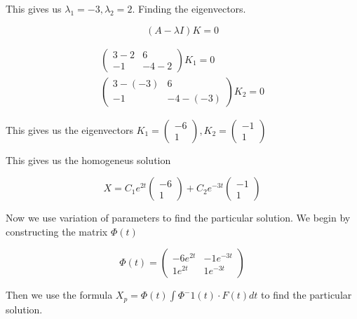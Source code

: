 \documentclass[a4paper]{article}
\begin{document}
This gives us $\lambda_1 = -3, \lambda_2 = 2$. Finding the eigenvectors.

\begin{equation}
    (A-\lambda I)K = 0
\end{equation}

\begin{align}
    \begin{pmatrix}
        3-2 & 6 \\
        -1 & -4 - 2
    \end{pmatrix}
    K_1
    = 0 \\
    \begin{pmatrix}
        3-(-3) & 6 \\
        -1 & -4 - (-3)
    \end{pmatrix}
    K_2
    = 0
\end{align}

This gives us the eigenvectors $K_1 = \begin{pmatrix}
    -6 \\
    1
\end{pmatrix}, K_2 = \begin{pmatrix}
    -1 \\
    1
\end{pmatrix}$

This gives us the homogeneus solution

\begin{equation}
    X = C_1 e^{2t} \begin{pmatrix}
        -6 \\
        1
    \end{pmatrix} + C_2 e^{-3t} \begin{pmatrix}
        -1 \\
        1
    \end{pmatrix}
\end{equation}

Now we use variation of parameters to find the particular solution. We begin by constructing the matrix $\Phi(t)$

\begin{equation}
    \Phi(t) = \begin{pmatrix}
        -6e^{2t} & -1e^{-3t} \\
        1e^{2t} & 1e^{-3t}
    \end{pmatrix}
\end{equation}

Then we use the formula $X_p = \Phi(t) \int \Phi^-1(t) \cdot F(t) dt$ to find the particular solution.
\end{document}
